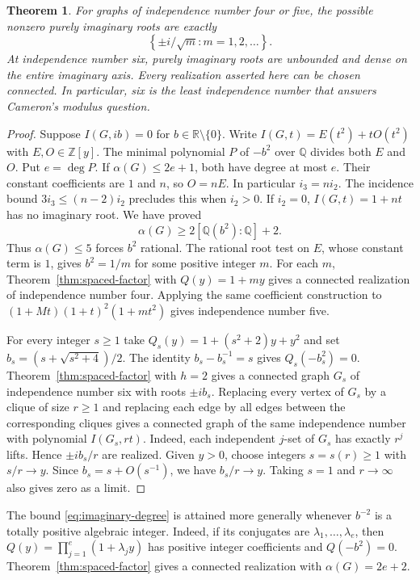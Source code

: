 \documentclass[11pt,a4paper]{article}
\newtheorem{theorem}{Theorem}[section]
\begin{document}
\begin{theorem}\label{thm:imaginary-threshold}
For graphs of independence number four or five, the possible
nonzero purely imaginary roots are exactly
\[
 \left\{\pm i/\sqrt{m}:m=1,2,\ldots\right\}.
\]
At independence number six, purely imaginary roots are unbounded and
dense on the entire imaginary axis. Every realization asserted here
can be chosen connected. In particular, six is the least independence
number that answers Cameron's modulus question.
\end{theorem}
\begin{proof}
Suppose $I(G,ib)=0$ for $b\in\mathbb R\setminus\{0\}$. Write
$I(G,t)=E(t^2)+tO(t^2)$ with $E,O\in\mathbb Z[y]$.
The minimal polynomial $P$ of $-b^2$ over $\mathbb Q$ divides both
$E$ and $O$. Put $e=\deg P$. If $\alpha(G)\le2e+1$, both have
degree at most $e$. Their constant coefficients are $1$ and $n$,
so $O=nE$. In particular $i_3=ni_2$. The incidence bound
$3i_3\le(n-2)i_2$ precludes this when $i_2>0$. If $i_2=0$,
$I(G,t)=1+nt$ has no imaginary root. We have proved
\begin{equation}\label{eq:imaginary-degree}
 \alpha(G)\ge 2[\mathbb Q(b^2):\mathbb Q]+2.
\end{equation}
Thus $\alpha(G)\le5$ forces $b^2$ rational. The rational root
test on $E$, whose constant term is $1$, gives $b^2=1/m$ for
some positive integer $m$. For each $m$, Theorem~\ref{thm:spaced-factor}
with $Q(y)=1+my$ gives a connected realization of independence
number four. Applying the same coefficient construction to
$(1+Mt)(1+t)^2(1+mt^2)$ gives independence number five.

For every integer $s\ge1$ take $Q_s(y)=1+(s^2+2)y+y^2$ and
set $b_s=(s+\sqrt{s^2+4})/2$. The identity
$b_s-b_s^{-1}=s$ gives $Q_s(-b_s^2)=0$.
Theorem~\ref{thm:spaced-factor} with $h=2$ gives a connected
graph $G_s$ of independence number six with roots $\pm i b_s$.
Replacing every vertex of $G_s$ by a clique of size $r\ge1$
and replacing each edge by all edges between the corresponding
cliques gives a connected graph of the same independence number
with polynomial $I(G_s,rt)$. Indeed, each independent $j$-set of
$G_s$ has exactly $r^j$ lifts. Hence $\pm i b_s/r$ are realized.
Given $y>0$, choose integers $s=s(r)\ge1$ with $s/r\to y$.
Since $b_s=s+O(s^{-1})$, we have $b_s/r\to y$.
Taking $s=1$ and $r\to\infty$ also gives zero as a limit.
\end{proof}

The bound \eqref{eq:imaginary-degree} is attained more generally whenever
$b^{-2}$ is a totally positive algebraic integer. Indeed, if its
conjugates are $\lambda_1,\ldots,\lambda_e$, then
$Q(y)=\prod_{j=1}^e(1+\lambda_j y)$ has positive integer coefficients
and $Q(-b^2)=0$. Theorem~\ref{thm:spaced-factor} gives a connected
realization with $\alpha(G)=2e+2$.
\end{document}
